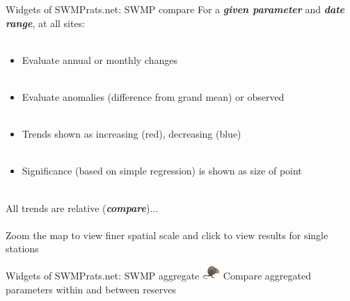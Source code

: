\documentclass[xcolor=dvipsnames,serif]{beamer}\usepackage[]{graphicx}\usepackage[]{color}
\newcommand{\Bigtxt}[1]{\textbf{\textit{#1}}}
\begin{document}
\begin{frame}{Widgets of SWMPrats.net: SWMP compare}
For a \Bigtxt{given parameter} and \Bigtxt{date range}, at all sites: \\~\\
\begin{itemize}
\item Evaluate annual or monthly changes\\~\\
\item Evaluate anomalies (difference from grand mean) or observed \\~\\
\item Trends shown as increasing (red), decreasing (blue) \\~\\
\item Significance (based on simple regression) is shown as size of point \\~\\
\end{itemize}
All trends are relative (\Bigtxt{compare})... \\~\\
Zoom the map to view finer spatial scale and click to view results for single stations
\end{frame}

\begin{frame}{Widgets of SWMPrats.net: SWMP aggregate}
\includegraphics[width = 0.05\textwidth]{imgs/swmprat.png}  Compare aggregated parameters within and between reserves
\centerline{}
\end{frame}
\end{document}
